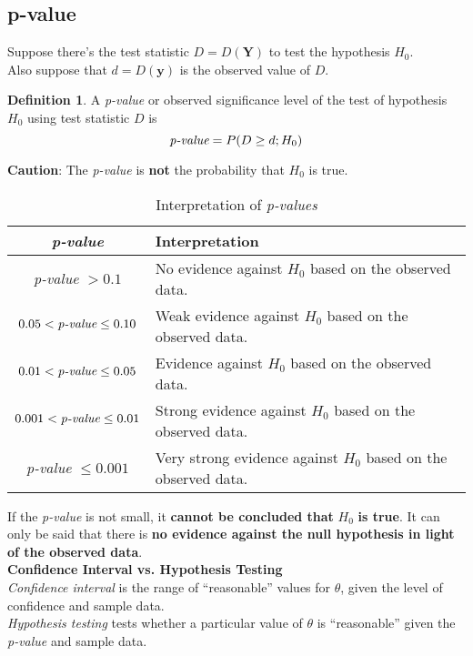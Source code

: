 \documentclass[12pt, leqno]{article}
\theoremstyle{definition}
\newtheorem*{defn}{Definition}
\begin{document}
  \subsection{p-value}
  Suppose there's the test statistic $D = D(\textbf{Y})$ to test the hypothesis $H_{0}$. \\
  Also suppose that $d = D(\textbf{y})$ is the observed value of $D$.
  \begin{defn}
    A \emph{p-value} or observed significance level of the test of hypothesis $H_{0}$ using test statistic $D$ is
    $$\emph{p-value} = P(D \geq d; H_{0})$$
  \end{defn}
  \textbf{Caution}: The \emph{p-value} is \textbf{not} the probability that $H_{0}$ is true.
  \begin{table}[H]
  \caption{Interpretation of \emph{p-values}}
  \begin{center}
  \begin{tabular}{c | p{9cm}}
    \bf \emph{p-value} & \bf Interpretation \\ \hline \hline
    \emph{p-value} $> 0.1$ & No evidence against $H_0$ based on the observed data. \\ \hline
    $0.05 < \emph{p-value} \leq 0.10$ & Weak evidence against $H_0$ based on the observed data. \\ \hline
    $0.01 < \emph{p-value} \leq 0.05$ & Evidence against $H_0$ based on the observed data. \\ \hline
    $0.001 < \emph{p-value} \leq 0.01$ & Strong evidence against $H_0$ based on the observed data. \\ \hline
    \emph{p-value} $\leq 0.001$ & Very strong evidence against $H_0$ based on the observed data.
  \end{tabular}
  \end{center}
  \end{table}
  If the \emph{p-value} is not small, it \textbf{cannot be concluded that} $H_{0}$ \textbf{is true}.
  It can only be said that there is \textbf{no evidence against the null hypothesis in light of the observed data}. \\

  \textbf{Confidence Interval vs. Hypothesis Testing} \\
  \emph{Confidence interval} is the range of ``reasonable'' values for $\theta$, given the level of confidence and sample data. \\
  \emph{Hypothesis testing} tests whether a particular value of $\theta$ is ``reasonable'' given the \emph{p-value} and sample data.
\end{document}
